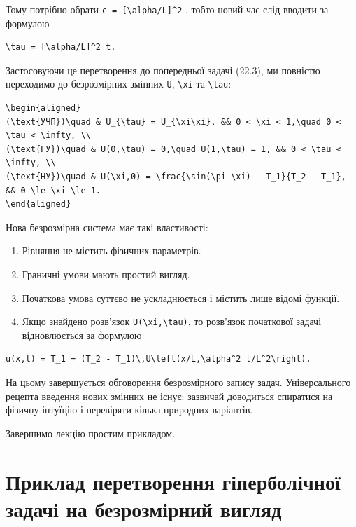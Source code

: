 \documentclass[
  ukrainian,
]{article}
\providecommand{\tightlist}{%
  \setlength{\itemsep}{0pt}\setlength{\parskip}{0pt}}
\begin{document}
Тому потрібно обрати \texttt{c\ =\ {[}\textbackslash{}alpha/L{]}\^{}2} ,
тобто новий час слід вводити за формулою

\begin{verbatim}
\tau = [\alpha/L]^2 t.
\end{verbatim}

Застосовуючи це перетворення до попередньої задачі (22.3), ми повністю
переходимо до безрозмірних змінних \texttt{U},
\texttt{\textbackslash{}xi} та \texttt{\textbackslash{}tau}:

\begin{verbatim}
\begin{aligned}
(\text{УЧП})\quad & U_{\tau} = U_{\xi\xi}, && 0 < \xi < 1,\quad 0 < \tau < \infty, \\
(\text{ГУ})\quad & U(0,\tau) = 0,\quad U(1,\tau) = 1, && 0 < \tau < \infty, \\
(\text{НУ})\quad & U(\xi,0) = \frac{\sin(\pi \xi) - T_1}{T_2 - T_1}, && 0 \le \xi \le 1.
\end{aligned}
\end{verbatim}

Нова безрозмірна система має такі властивості:

\begin{enumerate}
\def\labelenumi{\arabic{enumi}.}
\tightlist
\item
  Рівняння не містить фізичних параметрів.
\item
  Граничні умови мають простий вигляд.
\item
  Початкова умова суттєво не ускладнюється і містить лише відомі
  функції.
\item
  Якщо знайдено розв'язок
  \texttt{U(\textbackslash{}xi,\textbackslash{}tau)}, то розв'язок
  початкової задачі відновлюється за формулою
\end{enumerate}

\begin{verbatim}
u(x,t) = T_1 + (T_2 - T_1)\,U\left(x/L,\alpha^2 t/L^2\right).
\end{verbatim}

На цьому завершується обговорення безрозмірного запису задач.
Універсального рецепта введення нових змінних не існує: зазвичай
доводиться спиратися на фізичну інтуїцію і перевіряти кілька природних
варіантів.

Завершимо лекцію простим прикладом.

\section{Приклад перетворення гіперболічної задачі на безрозмірний
вигляд}\label{ux43fux440ux438ux43aux43bux430ux434-ux43fux435ux440ux435ux442ux432ux43eux440ux435ux43dux43dux44f-ux433ux456ux43fux435ux440ux431ux43eux43bux456ux447ux43dux43eux457-ux437ux430ux434ux430ux447ux456-ux43dux430-ux431ux435ux437ux440ux43eux437ux43cux456ux440ux43dux438ux439-ux432ux438ux433ux43bux44fux434}
\end{document}
